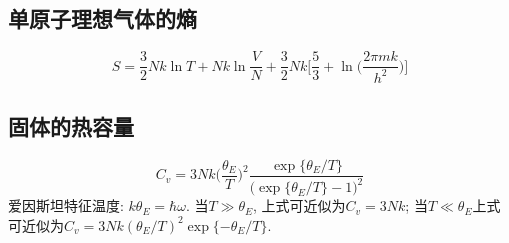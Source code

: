 
\subsection{单原子理想气体的熵}
\[
S = \frac{3}{2}Nk\ln T + Nk\ln \frac{V}{N} + \frac{3}{2}Nk\Bigg[\frac{5}{3}+\ln\bigg(\frac{2\pi mk}{h^2}\bigg)\Bigg]
\]


\subsection{固体的热容量}
\[
C_v = 3Nk\bigg(\frac{\theta_E}{T}\bigg)^2 \frac{\exp\{\theta_E/T\}}{\big(\exp\{\theta_E/T\}-1\big)^2}
\]
爱因斯坦特征温度: $k\theta_E = \hbar \omega$. 当$T\gg\theta_E$, 上式可近似为$C_v=3Nk$; 当$T\ll\theta_E$上式可近似为$C_v=3Nk(\theta_E/T)^2\exp\{-\theta_E/T\}$.

